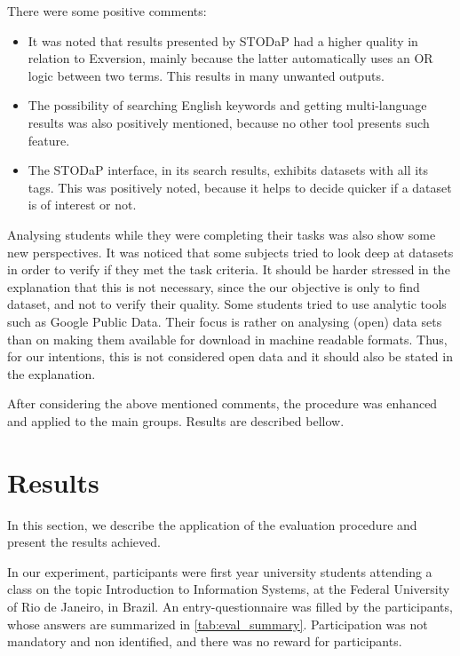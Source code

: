 There were some positive comments:
\begin{itemize}
	\item It was noted that results presented by STODaP had a higher quality in relation to Exversion, mainly because the latter automatically uses an OR logic between two terms.
	This results in many unwanted outputs.
	\item The possibility of searching English keywords and getting multi-language results was also positively mentioned, because no other tool presents such feature.
	\item The STODaP interface, in its search results, exhibits datasets with all its tags.
	This was positively noted, because it helps to decide quicker if a dataset is of interest or not.
\end{itemize}	

Analysing students while they were completing their tasks was also show some new perspectives.
It was noticed that some subjects tried to look deep at datasets in order to verify if they met the task criteria.
It should be harder stressed in the explanation that this is not necessary, since the our objective is only to find dataset, and not to verify their quality.
Some students tried to use analytic tools such as Google Public Data.
Their focus is rather on analysing (open) data sets than on making them available for download in machine readable formats.
Thus, for our intentions, this is not considered open data and it should also be stated in the explanation.

After considering the above mentioned comments, the procedure was enhanced and applied to the main groups.
Results are described bellow.

\section{Results}
\label{sec:eval_results}

In this section, we describe the application of the evaluation procedure and present the results achieved.

In our experiment, participants were first year university students attending a class on the topic Introduction to Information Systems, at the Federal University of Rio de Janeiro, in Brazil.
An entry-questionnaire was filled by the participants, whose answers are summarized in \autoref{tab:eval_summary}.
Participation was not mandatory and non identified, and there was no reward for participants.

